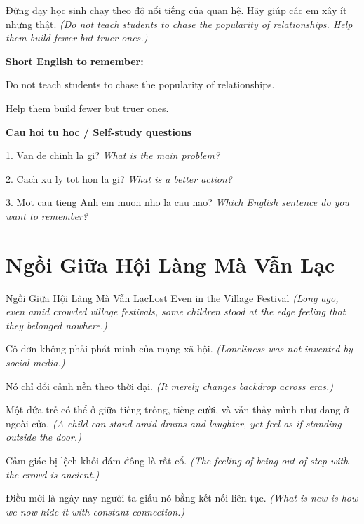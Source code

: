 \begin{baihoc}
Đừng dạy học sinh chạy theo độ nổi tiếng của quan hệ. Hãy giúp các em xây ít nhưng thật.
\textit{(Do not teach students to chase the popularity of relationships. Help them build fewer but truer ones.)}
\end{baihoc}

\begin{ghinhoanh}
\textbf{Short English to remember:}

Do not teach students to chase the popularity of relationships.

Help them build fewer but truer ones.

\end{ghinhoanh}

\begin{tuhocnhanh}
\textbf{Cau hoi tu hoc / Self-study questions}

1. Van de chinh la gi? \textit{What is the main problem?}

2. Cach xu ly tot hon la gi? \textit{What is a better action?}

3. Mot cau tieng Anh em muon nho la cau nao? \textit{Which English sentence do you want to remember?}
\end{tuhocnhanh}
\ngancach

\section{Ngồi Giữa Hội Làng Mà Vẫn Lạc}
\begin{truyen}{Ngồi Giữa Hội Làng Mà Vẫn Lạc}{Lost Even in the Village Festival}
\textit{(Long ago, even amid crowded village festivals, some children stood at the edge feeling that they belonged nowhere.)}

Cô đơn không phải phát minh của mạng xã hội.
\textit{(Loneliness was not invented by social media.)}

Nó chỉ đổi cảnh nền theo thời đại.
\textit{(It merely changes backdrop across eras.)}

Một đứa trẻ có thể ở giữa tiếng trống, tiếng cười, và vẫn thấy mình như đang ở ngoài cửa.
\textit{(A child can stand amid drums and laughter, yet feel as if standing outside the door.)}

Cảm giác bị lệch khỏi đám đông là rất cổ.
\textit{(The feeling of being out of step with the crowd is ancient.)}

Điều mới là ngày nay người ta giấu nó bằng kết nối liên tục.
\textit{(What is new is how we now hide it with constant connection.)}

\end{truyen}


